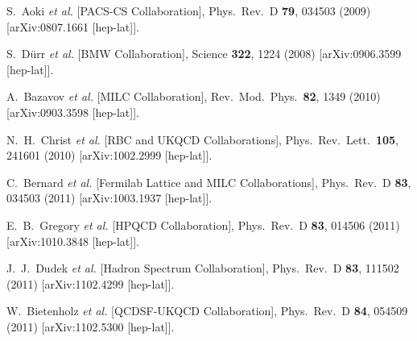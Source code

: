 \begin{thebibliography}{99}
  S.~Aoki {\it et al.}  [PACS-CS Collaboration],
  Phys.\ Rev.\ D {\bf 79}, 034503 (2009)
  [arXiv:0807.1661 [hep-lat]].
  
  S.~D{\"u}rr {\it et al.} [BMW Collaboration],
  Science {\bf 322}, 1224 (2008)
  [arXiv:0906.3599 [hep-lat]].
  
  A.~Bazavov {\it et al.} [MILC Collaboration],
  Rev.\ Mod.\ Phys.\  {\bf 82}, 1349 (2010)
  [arXiv:0903.3598 [hep-lat]].

  N.~H.~Christ {\it et al.} [RBC and UKQCD Collaborations],
  Phys.\ Rev.\ Lett.\  {\bf 105}, 241601 (2010)
  [arXiv:1002.2999 [hep-lat]].
  
  C.~Bernard {\it et al.}  [Fermilab Lattice and MILC Collaborations],
  Phys.\ Rev.\ D {\bf 83}, 034503 (2011)
  [arXiv:1003.1937 [hep-lat]].
  
  E.~B.~Gregory {\it et al.} [HPQCD Collaboration],
  Phys.\ Rev.\ D {\bf 83}, 014506 (2011)
  [arXiv:1010.3848 [hep-lat]].
  
  J.~J.~Dudek {\it et al.} [Hadron Spectrum Collaboration],
  Phys.\ Rev.\ D {\bf 83}, 111502 (2011)
  [arXiv:1102.4299 [hep-lat]].
  
  W.~Bietenholz {\it et al.} [QCDSF-UKQCD Collaboration],
  Phys.\ Rev.\ D {\bf 84}, 054509 (2011)
  [arXiv:1102.5300 [hep-lat]].
  

\end{thebibliography}
